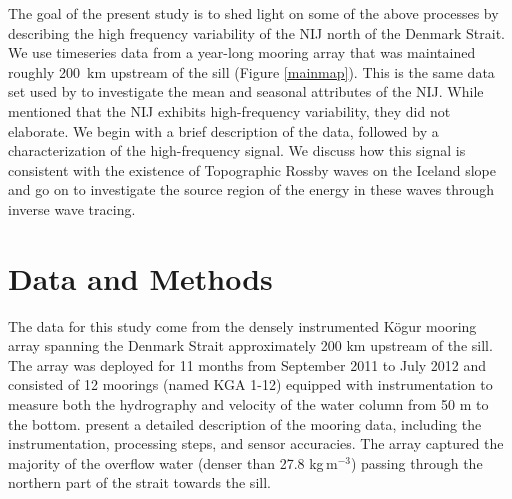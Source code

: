 \documentclass[12pt,titlepage,figuresatend]{article}
\begin{document}
The goal of the present study is to shed light on some of the above processes by describing the high frequency variability of the NIJ north of the Denmark Strait. We use timeseries data from a year-long mooring array that was maintained roughly 200~km upstream of the sill (Figure \ref{mainmap}). This is the same data set used by \cite{Harden2016} to investigate the mean and seasonal attributes of the NIJ. While \cite{Harden2016} mentioned that the NIJ exhibits high-frequency variability, they did not elaborate. We begin with a brief description of the data, followed by a characterization of the high-frequency signal. We discuss how this signal is consistent with the existence of Topographic Rossby waves on the Iceland slope and go on to investigate the source region of the energy in these waves through inverse wave tracing.


\section{Data and Methods}

The data for this study come from the densely instrumented K\"{o}gur mooring array spanning the Denmark Strait approximately 200 km upstream of the sill. The array was deployed for 11 months from September 2011 to July 2012 and consisted of 12 moorings (named KGA 1-12) equipped with instrumentation to measure both the hydrography and velocity of the water column from 50 m to the bottom. \cite{Harden2016} present a detailed description of the mooring data, including the instrumentation, processing steps, and sensor accuracies. The array captured the majority of the overflow water (denser than 27.8 kg$\,$m$^{-3}$) passing through the northern part of the strait towards the sill.
\end{document}
